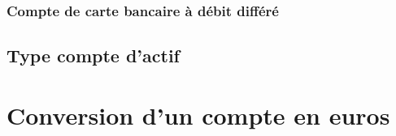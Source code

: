 \subsubsection{Compte de carte bancaire à débit différé\label{accounts-type-cash-deferredCards}}


\subsection{Type compte d'actif\label{accounts-type-assets}}



\section{Conversion d'un compte en euros\label{accounts-switcheuro}}



